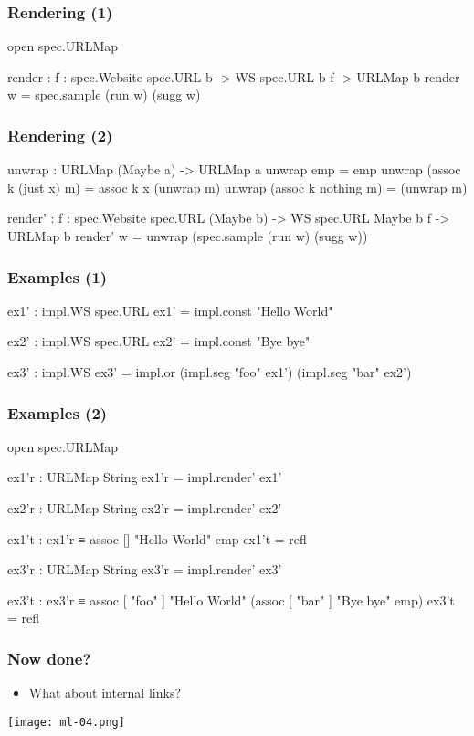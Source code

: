 \documentclass[aspectratio=169]{beamer}
\begin{document}
\begin{frame}
\frametitle{Rendering (1)}
\begin{code}
  open spec.URLMap

  render : {f : spec.Website spec.URL b}
           -> WS {spec.URL} {b} {f}
           -> URLMap b
  render w = spec.sample (run w) (sugg w)
\end{code}
\end{frame}

\begin{frame}
\frametitle{Rendering (2)}
\begin{code}
  unwrap : URLMap (Maybe a) -> URLMap a
  unwrap emp = emp
  unwrap (assoc k (just x) m) = assoc k x (unwrap m)
  unwrap (assoc k nothing m) = (unwrap m)

  render' : {f : spec.Website spec.URL (Maybe b)}
            -> WS {spec.URL} {Maybe b} {f}
            -> URLMap b
  render' w = unwrap (spec.sample (run w) (sugg w))
\end{code}
\end{frame}

\begin{frame}
\frametitle{Examples (1)}
\begin{code}
ex1' : impl.WS {spec.URL}
ex1' = impl.const "Hello World"

ex2' : impl.WS {spec.URL}
ex2' = impl.const "Bye bye"

ex3' : impl.WS
ex3' = impl.or (impl.seg "foo" ex1')
               (impl.seg "bar" ex2')
\end{code}
\end{frame}

\begin{frame}
\frametitle{Examples (2)}
\begin{code}
open spec.URLMap

ex1'r : URLMap String
ex1'r = impl.render' ex1'

ex2'r : URLMap String
ex2'r = impl.render' ex2'

ex1't : ex1'r ≡ assoc [] "Hello World" emp
ex1't = refl

ex3'r : URLMap String
ex3'r = impl.render' ex3'

ex3't : ex3'r ≡ assoc [ "foo" ] "Hello World"
               (assoc [ "bar" ] "Bye bye"
                emp)
ex3't = refl
\end{code}
\end{frame}


\begin{frame}
\frametitle{Now done?}
\begin{itemize}
  \item What about internal links?
\end{itemize}
\texttt{[image: ml-04.png]}
\end{frame}
\end{document}

